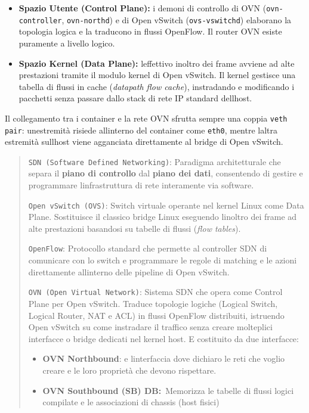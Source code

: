 \begin{itemize}
\tightlist
\item
  \textbf{Spazio Utente (Control Plane):} i demoni di controllo di OVN
  (\passthrough{\lstinline!ovn-controller!},
  \passthrough{\lstinline!ovn-northd!}) e di Open vSwitch
  (\passthrough{\lstinline!ovs-vswitchd!}) elaborano la topologia logica
  e la traducono in flussi OpenFlow. Il router OVN esiste puramente a
  livello logico.
\item
  \textbf{Spazio Kernel (Data Plane):} l\textquotesingle effettivo
  inoltro dei frame avviene ad alte prestazioni tramite il modulo kernel
  di Open vSwitch. Il kernel gestisce una tabella di flussi in cache
  (\emph{datapath flow cache}), instradando e modificando i pacchetti
  senza passare dallo stack di rete IP standard
  dell\textquotesingle host.
\end{itemize}

Il collegamento tra i container e la rete OVN sfrutta sempre una coppia
\passthrough{\lstinline!veth pair!}: un\textquotesingle estremità
risiede all\textquotesingle interno del container come
\passthrough{\lstinline!eth0!}, mentre l\textquotesingle altra estremità
sull\textquotesingle host viene agganciata direttamente al bridge di
Open vSwitch.

\begin{quote}
\passthrough{\lstinline!SDN (Software Defined Networking)!}: Paradigma
architetturale che separa il \textbf{piano di controllo} dal
\textbf{piano dei dati}, consentendo di gestire e programmare
l\textquotesingle infrastruttura di rete interamente via software.

\passthrough{\lstinline!Open vSwitch (OVS)!}: Switch virtuale operante
nel kernel Linux come Data Plane. Sostituisce il classico bridge Linux
eseguendo l\textquotesingle inoltro dei frame ad alte prestazioni
basandosi su tabelle di flussi (\emph{flow tables}).

\passthrough{\lstinline!OpenFlow!}: Protocollo standard che permette al
controller SDN di comunicare con lo switch e programmare le regole di
matching e le azioni direttamente all\textquotesingle interno delle
pipeline di Open vSwitch.

\passthrough{\lstinline!OVN (Open Virtual Network)!}: Sistema SDN che
opera come Control Plane per Open vSwitch. Traduce topologie logiche
(Logical Switch, Logical Router, NAT e ACL) in flussi OpenFlow
distribuiti, istruendo Open vSwitch su come instradare il traffico senza
creare molteplici interfacce o bridge dedicati nel kernel host.
E\textquotesingle{} costituito da due interfacce:

\begin{itemize}
\tightlist
\item
  \textbf{OVN Northbound}: e\textquotesingle{}
  l\textquotesingle interfaccia dove dichiaro le reti che voglio creare
  e le loro proprietà che devono rispettare.
\item
  \textbf{OVN Southbound (SB) DB:}~Memorizza le tabelle di flussi logici
  compilate e le associazioni di chassis (host fisici)
\end{itemize}
\end{quote}

